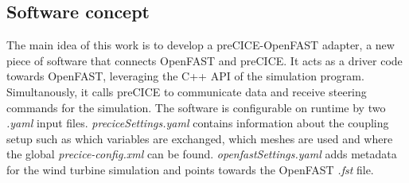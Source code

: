 \subsection{Software concept}

The main idea of this work is to develop a preCICE-OpenFAST adapter, a new piece of software that connects OpenFAST and preCICE. It acts as a driver code towards OpenFAST, leveraging the C++ API of the simulation program. Simultanously, it calls preCICE to communicate data and receive steering commands for the simulation. The software is configurable on runtime by two \textit{.yaml} input files. \textit{preciceSettings.yaml} contains information about the coupling setup such as which variables are exchanged, which meshes are used and where the global \textit{precice-config.xml} can be found. \textit{openfastSettings.yaml} adds metadata for the wind turbine simulation and points towards the OpenFAST \textit{.fst} file.\\

